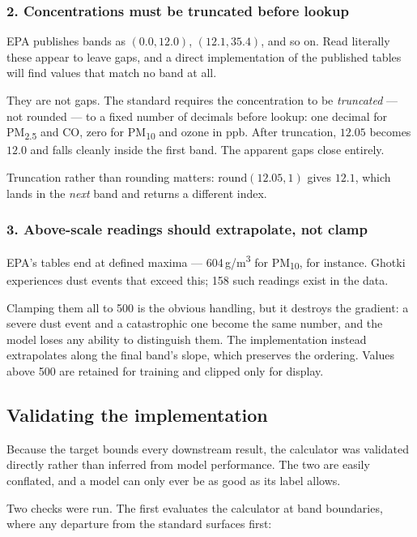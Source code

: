 \documentclass[11pt,a4paper]{article}
\begin{document}
\subsubsection*{2. Concentrations must be truncated before lookup}

EPA publishes bands as $(0.0, 12.0)$, $(12.1, 35.4)$, and so on. Read
literally these appear to leave gaps, and a direct implementation of the
published tables will find values that match no band at all.

They are not gaps. The standard requires the concentration to be
\emph{truncated} --- not rounded --- to a fixed number of decimals
before lookup: one decimal for PM\textsubscript{2.5} and CO, zero for
PM\textsubscript{10} and ozone in ppb. After truncation, $12.05$ becomes
$12.0$ and falls cleanly inside the first band. The apparent gaps close
entirely.

Truncation rather than rounding matters: $\mathrm{round}(12.05, 1)$
gives $12.1$, which lands in the \emph{next} band and returns a
different index.

\subsubsection*{3. Above-scale readings should extrapolate, not clamp}

EPA's tables end at defined maxima --- 604\,\textmu g/m\textsuperscript{3}
for PM\textsubscript{10}, for instance. Ghotki experiences dust events
that exceed this; 158 such readings exist in the data.

Clamping them all to 500 is the obvious handling, but it destroys the
gradient: a severe dust event and a catastrophic one become the same
number, and the model loses any ability to distinguish them. The
implementation instead extrapolates along the final band's slope, which
preserves the ordering. Values above 500 are retained for training and
clipped only for display.

\subsection{Validating the implementation}

Because the target bounds every downstream result, the calculator was
validated directly rather than inferred from model performance. The two
are easily conflated, and a model can only ever be as good as its label
allows.

Two checks were run. The first evaluates the calculator at band
boundaries, where any departure from the standard surfaces first:
\end{document}
